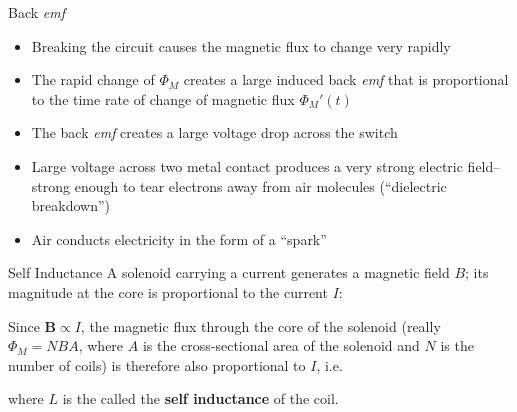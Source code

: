\documentclass[12pt,aspectratio=169]{beamer}
\newcommand{\mb}[1]{\mathbf{#1}}
\newcommand{\eq}[2]{\vspace{#1}{\Large\begin{displaymath}#2\end{displaymath}}}
\begin{document}
\begin{frame}{Back \emph{emf}}
  \begin{center}
  \end{center}
  \begin{itemize}
  \item Breaking the circuit causes the magnetic flux to change very rapidly
  \item The rapid change of $\Phi_M$ creates a large induced back \emph{emf}
    that is proportional to the time rate of change of magnetic flux
    $\Phi_M'(t)$
  \item The back \emph{emf} creates a large voltage drop across the switch
  \item Large voltage across two metal contact produces a very strong electric
    field--strong enough to tear electrons away from air molecules
    (``dielectric breakdown'')
  \item Air conducts electricity in the form of a ``spark''
  \end{itemize}
\end{frame}



\begin{frame}{Self Inductance}
  A solenoid carrying a current generates a magnetic field $B$; its magnitude at
  the core is proportional to the current $I$:

  \eq{-.2in}{
    B=\left[\frac{\mu_0N}{\ell}\right]I
  }

  Since $\mb{B}\propto I$, the magnetic flux through the core of the solenoid
  (really $\Phi_M=NBA$, where $A$ is the cross-sectional area of the solenoid
  and $N$ is the number of coils) is therefore also proportional to $I$, i.e.

  \eq{-.2in}{
    \boxed{\Phi_M=LI}
  }

  where $L$ is the called the \textbf{self inductance} of the coil.
\end{frame}
\end{document}
